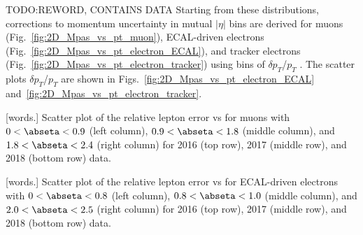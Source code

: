TODO:REWORD, CONTAINS DATA
Starting from these distributions, corrections to momentum uncertainty in mutual $|\eta|$ bins are derived for muons (Fig.~\ref{fig:2D_Mpas_vs_pt_muon}), ECAL-driven electrons (Fig.~\ref{fig:2D_Mpas_vs_pt_electron_ECAL}), and tracker electrons (Fig.~\ref{fig:2D_Mpas_vs_pt_electron_tracker}) using bins of $\delta p_{T}$/$p_{T}$ \vs \abseta.
The scatter plots $\delta p_{T}$/$p_{T}$ \vs \PT are shown in Figs.~\ref{fig:2D_Mpas_vs_pt_electron_ECAL} and~\ref{fig:2D_Mpas_vs_pt_electron_tracker}.
\begin{multiFigure}
    \centering


        [words.]
        {Scatter plot of the relative lepton \PT error vs \PT for muons with $0 < \abseta < 0.9$ (left column), $0.9 < \abseta < 1.8$ (middle column), and $1.8 < \abseta < 2.4$ (right column) for 2016 (top row), 2017 (middle row), and 2018 (bottom row) data.}
    \label{fig:2D_Mpas_vs_pt_muon}
\end{multiFigure}
\begin{multiFigure}
    \centering


        [words.]
        {Scatter plot of the relative lepton \PT error vs \PT for ECAL-driven electrons with $0 < \abseta < 0.8$ (left column), $0.8 < \abseta < 1.0$ (middle column), and $2.0 < \abseta < 2.5$ (right column) for 2016 (top row), 2017 (middle row), and 2018 (bottom row) data.}
    \label{fig:2D_Mpas_vs_pt_electron_ECAL}
\end{multiFigure}

